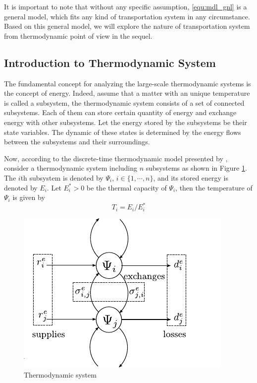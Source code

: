 \documentclass[preprint,authoryear,12pt]{elsarticle}
\begin{document}
It is important to note that without any specific assumption, \eqref{equ:mdl_gnl} is a general model, which fits any kind of transportation system in any circumstance. Based on this general model, we will explore the nature of transportation system from thermodynamic point of view in the sequel.

\subsection{Introduction to Thermodynamic System}

The fundamental concept for analyzing the large-scale thermodynamic systems is the concept of energy. Indeed, assume that a matter with an unique temperature is called a subsystem, the thermodynamic system consists of a set of connected subsystems. Each of them can store certain quantity of energy and exchange energy with other subsystems.
Let the energy stored by the subsystems be their state variables. The dynamic of these states is determined by the energy flows between the subsystems and their surroundings.

Now, according to the discrete-time thermodynamic model presented by \citet{haddad_thermodynamic_2005}, consider a thermodynamic system including $n$ subsystems as shown in Figure \ref{fig:Ther_Sys}. The $i$th subsystem is denoted by $\Psi_i$, $i\in \{1,\cdots,n\}$, and its stored energy is denoted by $E_i$. Let $E_i^*>0$ be the thermal capacity of $\Psi_i$, then the temperature of $\Psi_i$ is given by
\begin{equation}\label{equ:temperature}
    T_i= {E_i}/{E^*_i}
\end{equation}

\begin{figure}[ht]
  \centering
  \includegraphics{pics/HModel}
  \caption{Thermodynamic system}
  \label{fig:Ther_Sys}
\end{figure}
\end{document}
